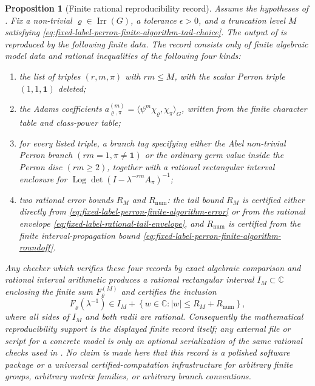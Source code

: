 \documentclass[11pt,a4paper]{amsart}
\theoremstyle{plain}
\newtheorem{proposition}[theorem]{Proposition}
\theoremstyle{definition}
\theoremstyle{remark}
\DeclareMathOperator{\Irr}{Irr}
\DeclareMathOperator{\Log}{Log}
\newcommand{\CC}{\mathbb{C}}
\newcommand{\abs}[1]{\lvert #1 \rvert}
\begin{document}
\begin{proposition}[Finite rational reproducibility record]
  \label{prop:fixed-label-rational-certificate-record}
  Assume the hypotheses of .  Fix a
  non-trivial \(\varrho\in\Irr(G)\), a tolerance \(\epsilon>0\), and a
  truncation level \(M\) satisfying
  \eqref{eq:fixed-label-perron-finite-algorithm-tail-choice}.  The output of
   is reproduced by the following
  finite data.  The record consists only of finite algebraic model data and
  rational inequalities of the following four kinds:
  \begin{enumerate}[label=\textup{(\roman*)},leftmargin=*]
    \item the list of triples \((r,m,\pi)\) with \(rm\le M\), with the scalar
      Perron triple \((1,1,\mathbf1)\) deleted;
    \item the Adams coefficients \(a_{\varrho,
      \pi}^{(m)}=\langle\psi^m\chi_\varrho,\chi_\pi\rangle_G\), written from
      the finite character table and class-power table;
    \item for every listed triple, a branch tag specifying either the Abel
      non-trivial Perron branch \((rm=1,\pi\ne\mathbf1)\) or the ordinary germ
      value inside the Perron disc \((rm\ge2)\), together with a rational
      rectangular interval enclosure for
      \(\Log\det(I-\lambda^{-rm}A_\pi)^{-1}\);
    \item two rational error bounds \(R_M\) and \(R_{\mathrm{num}}\): the
      tail bound \(R_M\) is certified either directly from
      \eqref{eq:fixed-label-perron-finite-algorithm-error} or from the
      rational envelope \eqref{eq:fixed-label-rational-tail-envelope}, and
      \(R_{\mathrm{num}}\) is certified from the finite interval-propagation
      bound \eqref{eq:fixed-label-perron-finite-algorithm-roundoff}.
  \end{enumerate}
  Any checker which verifies these four records by exact algebraic comparison
  and rational interval arithmetic produces a rational rectangular interval
  \(I_M\subset\CC\) enclosing the finite sum \(F_\varrho^{(M)}\) and certifies
  the inclusion
  \begin{equation}\label{eq:fixed-label-certificate-interface-inclusion}
    F_\varrho(\lambda^{-1})
    \in
    I_M+
    \left\{w\in\CC:
      \abs{w}\le R_M+R_{\mathrm{num}}\right\},
  \end{equation}
  where all sides of \(I_M\) and both radii are rational.  Consequently the
  mathematical reproducibility support is the displayed finite record itself;
  any external
  file or script for a concrete model is only an optional serialization of the
  same rational checks used in
  .
  No claim is made here that this record is a polished software package or a
  universal certified-computation infrastructure for arbitrary finite groups,
  arbitrary matrix families, or arbitrary branch conventions.
\end{proposition}
\end{document}
